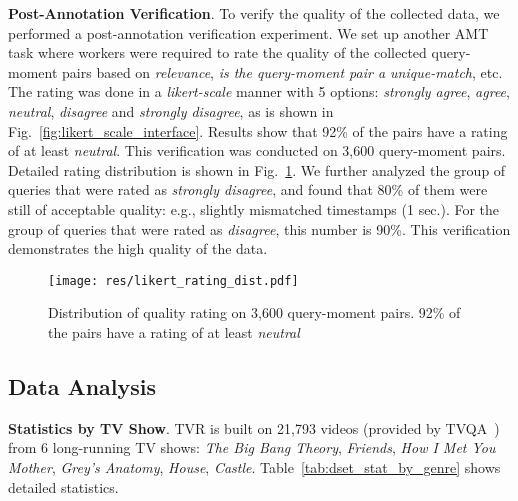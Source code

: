 \documentclass[runningheads]{llncs}
\begin{document}
\kern2mm
\noindent\textbf{Post-Annotation Verification}. 
To verify the quality of the collected data, we performed a post-annotation verification experiment. 
We set up another AMT task where workers were required to rate the quality of the collected query-moment pairs based on \textit{relevance}, \textit{is the query-moment pair a unique-match}, etc. 
The rating was done in a \textit{likert-scale} manner with 5 options: \textit{strongly agree}, \textit{agree}, \textit{neutral}, \textit{disagree} and \textit{strongly disagree}, as is shown in Fig.~\ref{fig:likert_scale_interface}.
Results show that 92\% of the pairs have a rating of at least \textit{neutral}. This verification was conducted on 3,600 query-moment pairs. Detailed rating distribution is shown in Fig.~\ref{fig:likert_rating_dist}. We further analyzed the group of queries that were rated as \textit{strongly disagree}, and found that 80\% of them were still of acceptable quality: e.g., slightly mismatched timestamps (1 sec.). For the group of queries that were rated as \textit{disagree}, this number is 90\%. This verification demonstrates the high quality of the data.


\begin{figure}[!t]
  \centering
  \texttt{[image: res/likert\_rating\_dist.pdf]}
  \caption{Distribution of quality rating on 3,600 query-moment pairs. 92\% of the pairs have a rating of at least \textit{neutral}
  }
  \label{fig:likert_rating_dist}
\end{figure}



\subsection{Data Analysis}\label{subsec:supp_data_analysis}
\noindent\textbf{Statistics by TV Show}. TVR is built on 21,793 videos (provided by TVQA~\cite{Lei2018TVQALC}) from 6 long-running TV shows: \textit{The Big Bang Theory}, \textit{Friends}, \textit{How I Met You Mother}, \textit{Grey's Anatomy}, \textit{House}, \textit{Castle}. Table~\ref{tab:dset_stat_by_genre} shows detailed statistics. 
\end{document}
